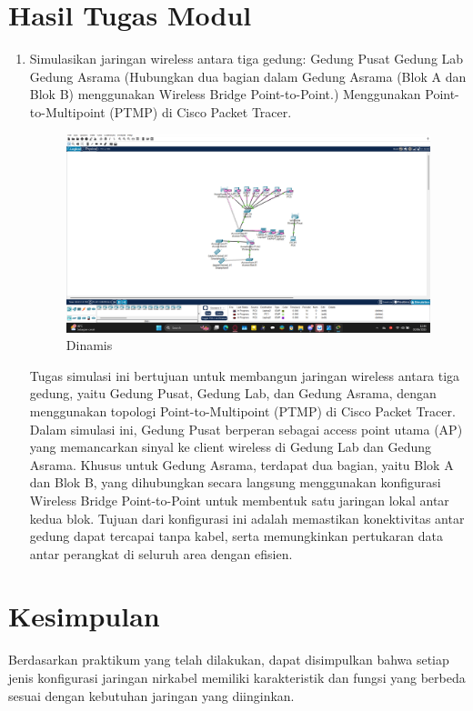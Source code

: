\section{Hasil Tugas Modul}
\begin{enumerate}
    \item Simulasikan jaringan wireless antara tiga gedung: Gedung Pusat Gedung Lab Gedung Asrama (Hubungkan dua bagian dalam Gedung Asrama (Blok A dan Blok B) menggunakan Wireless Bridge Point-to-Point.)
Menggunakan Point-to-Multipoint (PTMP) di Cisco Packet Tracer.
    \begin{figure}[H]
        \centering
        \includegraphics[width=0.8\linewidth]{P1/img/1.png}
        \caption{Dinamis}
        \label{fig:gambar4}
    \end{figure}
Tugas simulasi ini bertujuan untuk membangun jaringan wireless antara tiga gedung, yaitu Gedung Pusat, Gedung Lab, dan Gedung Asrama, dengan menggunakan topologi Point-to-Multipoint (PTMP) di Cisco Packet Tracer. Dalam simulasi ini, Gedung Pusat berperan sebagai access point utama (AP) yang memancarkan sinyal ke client wireless di Gedung Lab dan Gedung Asrama. Khusus untuk Gedung Asrama, terdapat dua bagian, yaitu Blok A dan Blok B, yang dihubungkan secara langsung menggunakan konfigurasi Wireless Bridge Point-to-Point untuk membentuk satu jaringan lokal antar kedua blok. Tujuan dari konfigurasi ini adalah memastikan konektivitas antar gedung dapat tercapai tanpa kabel, serta memungkinkan pertukaran data antar perangkat di seluruh area dengan efisien.
  

\end{enumerate}

\section{Kesimpulan}
Berdasarkan praktikum yang telah dilakukan, dapat disimpulkan bahwa setiap jenis konfigurasi jaringan nirkabel memiliki karakteristik dan fungsi yang berbeda sesuai dengan kebutuhan jaringan yang diinginkan.

